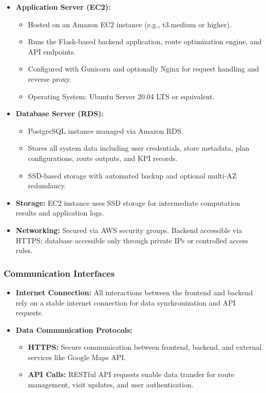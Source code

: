 \begin{itemize}
    \item \textbf{Application Server (EC2):}
    \begin{itemize}
        \item Hosted on an Amazon EC2 instance (e.g., t3.medium or higher).
        \item Runs the Flask-based backend application, route optimization engine, and API endpoints.
        \item Configured with Gunicorn and optionally Nginx for request handling and reverse proxy.
        \item Operating System: Ubuntu Server 20.04 LTS or equivalent.
    \end{itemize}

    \item \textbf{Database Server (RDS):}
    \begin{itemize}
        \item PostgreSQL instance managed via Amazon RDS.
        \item Stores all system data including user credentials, store metadata, plan configurations, route outputs, and KPI records.
        \item SSD-based storage with automated backup and optional multi-AZ redundancy.
    \end{itemize}

    \item \textbf{Storage:} EC2 instance uses SSD storage for intermediate computation results and application logs.

    \item \textbf{Networking:} Secured via AWS security groups. Backend accessible via HTTPS; database accessible only through private IPs or controlled access rules.
\end{itemize}

\subsubsection{Communication Interfaces}
\begin{itemize}
    \item \textbf{Internet Connection:} All interactions between the frontend and backend rely on a stable internet connection for data synchronization and API requests.
\newpage
    \item \textbf{Data Communication Protocols:}
    \begin{itemize}
        \item \textbf{HTTPS:} Secure communication between frontend, backend, and external services like Google Maps API.
        \item \textbf{API Calls:} RESTful API requests enable data transfer for route management, visit updates, and user authentication.
    \end{itemize}
\end{itemize}

